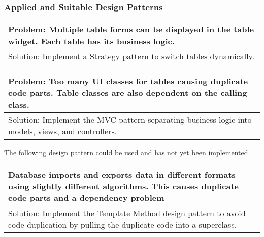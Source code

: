 \documentclass[letterpaper,10pt,english]{sphinxmanual}
\begin{document}
\subsubsection{Applied and Suitable Design Patterns}
\label{\detokenize{implementation:applied-and-suitable-design-patterns}}

\begin{savenotes}\sphinxattablestart
\centering
\begin{tabulary}{\linewidth}[t]{|T|}
\hline
\sphinxstyletheadfamily 
Problem: Multiple table forms can be displayed in the table widget. Each table has its business logic.
\\
\hline
Solution: Implement a Strategy pattern to switch tables dynamically.
\\
\hline
\end{tabulary}
\par
\sphinxattableend\end{savenotes}

\begin{figure}[htbp]
\centering

\noindent{}
\end{figure}


\begin{savenotes}\sphinxattablestart
\centering
\begin{tabulary}{\linewidth}[t]{|T|}
\hline
\sphinxstyletheadfamily 
Problem: Too many UI classes for tables causing duplicate code parts. Table classes are also dependent
on the calling class.
\\
\hline
Solution: Implement the MVC pattern separating business logic into models, views, and controllers.
\\
\hline
\end{tabulary}
\par
\sphinxattableend\end{savenotes}

\begin{figure}[htbp]
\centering

\noindent{}
\end{figure}

The following design pattern could be used and has not yet been implemented.


\begin{savenotes}\sphinxattablestart
\centering
\begin{tabulary}{\linewidth}[t]{|T|}
\hline
\sphinxstyletheadfamily 
Database imports and exports data in different formats using slightly different algorithms.
This causes duplicate code parts and a dependency problem
\\
\hline
Solution: Implement the Template Method design pattern to avoid code duplication by pulling
the duplicate code into a superclass.
\\
\hline
\end{tabulary}
\par
\sphinxattableend\end{savenotes}
\end{document}
